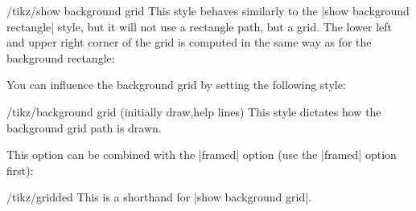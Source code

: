 \begin{stylekey}{/tikz/show background grid}
    This style behaves similarly to the |show background rectangle| style, but
    it will not use a rectangle path, but a grid. The lower left and upper
    right corner of the grid is computed in the same way as for the background
    rectangle:
\begin{codeexample}[preamble={\usetikzlibrary{backgrounds}}]
\end{codeexample}
    You can influence the background grid by setting the following style:
    \begin{stylekey}{/tikz/background grid (initially draw,help lines)}
        This style dictates how the background grid path is drawn.
\begin{codeexample}[preamble={\usetikzlibrary{backgrounds}}]
\end{codeexample}
    \end{stylekey}
    This option can be combined with the |framed| option (use the |framed|
    option first):
\begin{codeexample}[preamble={\usetikzlibrary{backgrounds}}]
\end{codeexample}
\end{stylekey}

\begin{stylekey}{/tikz/gridded}
    This is a shorthand for |show background grid|.
\end{stylekey}

